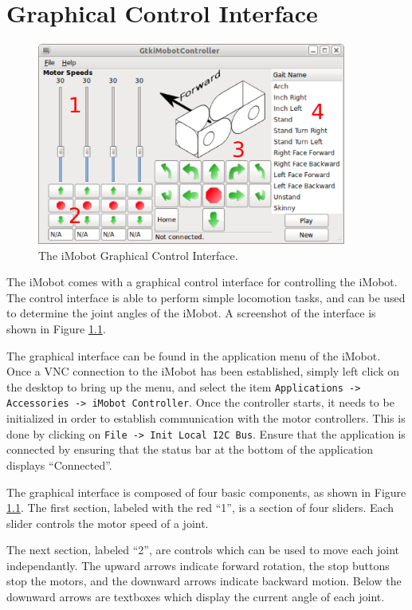 \documentclass[11pt]{report}
\begin{document}
\chapter{Graphical Control Interface}
\begin{figure}
\begin{center}
\includegraphics[width=4in]{gui_screenshot.png}
\caption{\label{fig:gui}The iMobot Graphical Control Interface.}
\end{center}
\end{figure}
The iMobot comes with a graphical control interface for controlling the iMobot.
The control interface is able to perform simple locomotion tasks, and can be
used to determine the joint angles of the iMobot. A screenshot of the interface
is shown in Figure \ref{fig:gui}.

The graphical interface can be found in the application menu of the iMobot. Once
a VNC connection to the iMobot has been established, simply left click on the
desktop to bring up the menu, and select the item \texttt{Applications ->
Accessories -> iMobot Controller}. Once the controller starts, it needs to be
initialized in order to establish communication with the motor controllers.
This is done by clicking on \texttt{File -> Init Local I2C Bus}. Ensure that 
the application is connected by ensuring that the status bar at the bottom of the
application displays ``Connected''. 

The graphical interface is composed of four basic components, as shown in
Figure \ref{fig:gui}. The first section, labeled with the red ``1'',
is a section of four sliders. Each slider controls the motor speed of a joint.

The next section, labeled ``2'', are controls which can be used to move each
joint independantly. The upward arrows indicate forward rotation, the stop
buttons stop the motors, and the downward arrows indicate backward motion.
Below the downward arrows are textboxes which display the current angle of each
joint.
\end{document}
